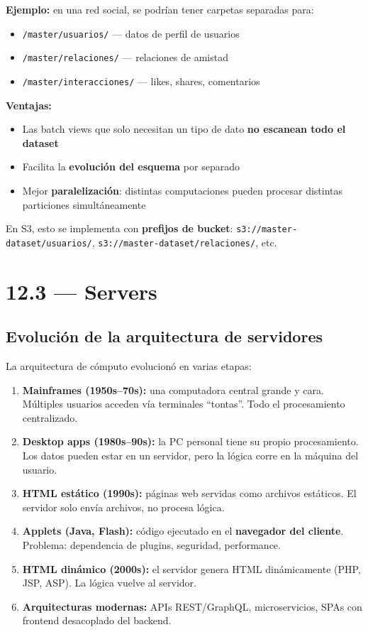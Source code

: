 \documentclass[11pt, a4paper]{article}
\begin{document}
\textbf{Ejemplo:} en una red social, se podrían tener carpetas separadas para:
\begin{itemize}
	\item \texttt{/master/usuarios/} --- datos de perfil de usuarios
	\item \texttt{/master/relaciones/} --- relaciones de amistad
	\item \texttt{/master/interacciones/} --- likes, shares, comentarios
\end{itemize}

\textbf{Ventajas:}
\begin{itemize}
	\item Las batch views que solo necesitan un tipo de dato \textbf{no escanean todo el dataset}
	\item Facilita la \textbf{evolución del esquema} por separado
	\item Mejor \textbf{paralelización}: distintas computaciones pueden procesar distintas particiones simultáneamente
\end{itemize}

En S3, esto se implementa con \textbf{prefijos de bucket}: \texttt{s3://master-dataset/usuarios/}, \texttt{s3://master-dataset/relaciones/}, etc.

\section{12.3 — Servers}

\subsection{Evolución de la arquitectura de servidores}

La arquitectura de cómputo evolucionó en varias etapas:

\begin{enumerate}
	\item \textbf{Mainframes (1950s--70s):} una computadora central grande y cara. Múltiples usuarios acceden vía terminales ``tontas''. Todo el procesamiento centralizado.
	\item \textbf{Desktop apps (1980s--90s):} la PC personal tiene su propio procesamiento. Los datos pueden estar en un servidor, pero la lógica corre en la máquina del usuario.
	\item \textbf{HTML estático (1990s):} páginas web servidas como archivos estáticos. El servidor solo envía archivos, no procesa lógica.
	\item \textbf{Applets (Java, Flash):} código ejecutado en el \textbf{navegador del cliente}. Problema: dependencia de plugins, seguridad, performance.
	\item \textbf{HTML dinámico (2000s):} el servidor genera HTML dinámicamente (PHP, JSP, ASP). La lógica vuelve al servidor.
	\item \textbf{Arquitecturas modernas:} APIs REST/GraphQL, microservicios, SPAs con frontend desacoplado del backend.
\end{enumerate}
\end{document}
